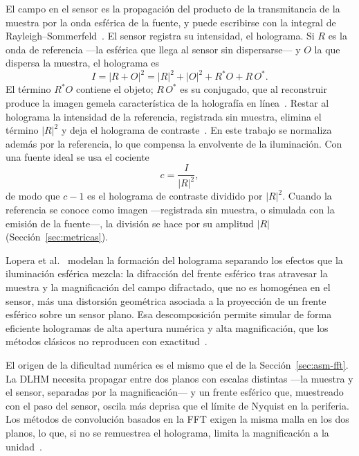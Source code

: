 El campo en el sensor es la propagación del producto de la transmitancia de la
muestra por la onda esférica de la fuente, y puede escribirse con la integral
de Rayleigh--Sommerfeld~\cite{lopera2024}. El sensor registra su intensidad,
el holograma. Si $R$ es la onda de referencia ---la esférica que llega al
sensor sin dispersarse--- y $O$ la que dispersa la muestra, el holograma es
\begin{equation}
  I = |R + O|^2 = |R|^2 + |O|^2 + R^*O + R\,O^*.
  \label{eq:holograma}
\end{equation}
El término $R^*O$ contiene el objeto; $R\,O^*$ es su conjugado, que al
reconstruir produce la imagen gemela característica de la holografía en
línea~\cite{gabor1948, latychevskaia2015}. Restar al holograma la intensidad
de la referencia, registrada sin muestra, elimina el término $|R|^2$ y deja el
holograma de contraste~\cite{garcia2006}. En este trabajo se normaliza además
por la referencia, lo que compensa la envolvente de la iluminación. Con una
fuente ideal se usa el cociente
\begin{equation}
  c = \frac{I}{|R|^2},
  \label{eq:contraste}
\end{equation}
de modo que $c - 1$ es el holograma de contraste dividido por $|R|^2$. Cuando
la referencia se conoce como imagen ---registrada sin muestra, o simulada con
la emisión de la fuente---, la división se hace por su amplitud $|R|$
(Sección~\ref{sec:metricas}).

Lopera et al.~\cite{lopera2024} modelan la formación del holograma separando
los efectos que la iluminación esférica mezcla: la difracción del frente
esférico tras atravesar la muestra y la magnificación del campo difractado,
que no es homogénea en el sensor, más una distorsión geométrica asociada a la
proyección de un frente esférico sobre un sensor plano. Esa descomposición
permite simular de forma eficiente hologramas de alta apertura numérica y alta
magnificación, que los métodos clásicos no reproducen con
exactitud~\cite{lopera2024}.

El origen de la dificultad numérica es el mismo que el de la
Sección~\ref{sec:asm-fft}. La DLHM necesita propagar entre dos planos con
escalas distintas ---la muestra y el sensor, separadas por la magnificación---
y un frente esférico que, muestreado con el paso del sensor, oscila más
deprisa que el límite de Nyquist en la periferia. Los métodos de convolución
basados en la FFT exigen la misma malla en los dos planos, lo que, si no se
remuestrea el holograma, limita la magnificación a la unidad~\cite{lopera2024}.

